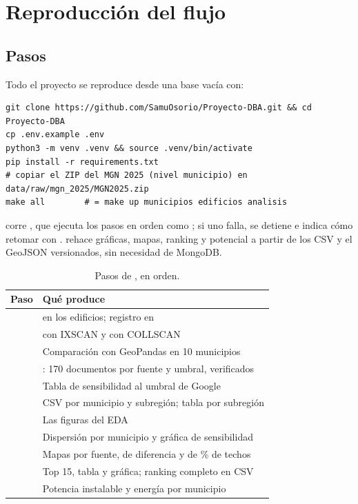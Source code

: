 \section{Reproducción del flujo}
\label{sec:reproduccion}

\subsection{Pasos}

Todo el proyecto se reproduce desde una base vacía con:

\begin{lstlisting}
git clone https://github.com/SamuOsorio/Proyecto-DBA.git && cd Proyecto-DBA
cp .env.example .env
python3 -m venv .venv && source .venv/bin/activate
pip install -r requirements.txt
# copiar el ZIP del MGN 2025 (nivel municipio) en data/raw/mgn_2025/MGN2025.zip
make all        # = make up municipios edificios analisis
\end{lstlisting}

 corre , que ejecuta los pasos
en orden como ; si uno falla, se detiene
e indica cómo retomar con .
 rehace gráficas, mapas, ranking y potencial a partir de
los CSV y el GeoJSON versionados, sin necesidad de MongoDB.

\begin{table}[H]
  \centering\small
  \caption{Pasos de , en orden.}
  \label{tab:pasos}
  \begin{tabularx}{\textwidth}{@{}l L@{}}
    \toprule
    \textbf{Paso} & \textbf{Qué produce} \\
    \midrule
     &  en los edificios; registro en  \\
     &  con IXSCAN y con COLLSCAN \\
     & Comparación con GeoPandas en 10 municipios \\
     & : 170 documentos por fuente y umbral, verificados \\
     & Tabla de sensibilidad al umbral de Google \\
     & CSV por municipio y subregión; tabla por subregión \\
     & Las figuras del EDA \\
     & Dispersión por municipio y gráfica de sensibilidad \\
     & Mapas por fuente, de diferencia y de \% de techos \\
     & Top 15, tabla y gráfica; ranking completo en CSV \\
     & Potencia instalable y energía por municipio \\
    \bottomrule
  \end{tabularx}
\end{table}


